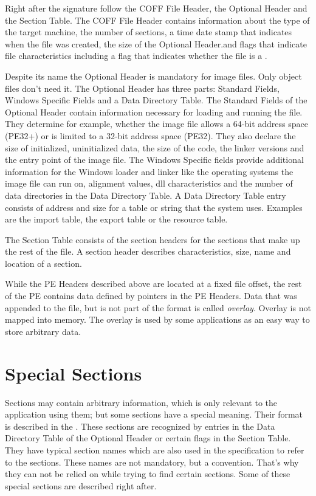 Right after the signature follow the COFF File Header, the Optional Header and the Section Table. The COFF File Header contains information about the type of the target machine, the number of sections, a time date stamp that indicates when the file was created, the size of the Optional Header.and flags that indicate file characteristics including a flag that indicates whether the file is a \DLL{}\label{dllflag}.

Despite its name the Optional Header is mandatory for image files. Only object files don't need it. The Optional Header has three parts: Standard Fields, Windows Specific Fields and a Data Directory Table.
The Standard Fields of the Optional Header contain information necessary for loading and running the file. They determine for example, whether the image file allows a 64-bit address space (PE32+) or is limited to a 32-bit address space (PE32). They also declare \ia{} the size of initialized, uninitialized data, the size of the code, the linker versions and the entry point of the image file.
The Windows Specific fields provide additional information for the Windows loader and linker like the operating systems the image file can run on, alignment values, dll characteristics and the number of data directories in the Data Directory Table.
A Data Directory Table entry consists of address and size for a table or string that the system uses. Examples are the import table, the export table or the resource table. 

The Section Table consists of the section headers for the sections that make up the rest of the \PE{} file. A section header describes \ia{} characteristics, size, name and location of a section.

While the PE Headers described above are located at a fixed file offset, the rest of the PE contains data defined by pointers in the PE Headers. Data that was appended to the file, but is not part of the \PE format is called \emph{overlay}. Overlay is not mapped into memory. The overlay is used by some applications as an easy way to store arbitrary data.

\section{Special Sections}

Sections may contain arbitrary information, which is only relevant to the application using them; but some sections have a special meaning. Their format is described in the \PECOFF{} \cite{pespec}. These sections are recognized by entries in the Data Directory Table of the Optional Header or certain flags in the Section Table. They have typical section names which are also used in the specification to refer to the sections. These names are not mandatory, but a convention. That's why they can not be relied on while trying to find certain sections.
Some of these special sections are described right after. 

